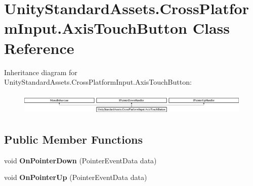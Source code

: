 \hypertarget{class_unity_standard_assets_1_1_cross_platform_input_1_1_axis_touch_button}{}\section{Unity\+Standard\+Assets.\+Cross\+Platform\+Input.\+Axis\+Touch\+Button Class Reference}
\label{class_unity_standard_assets_1_1_cross_platform_input_1_1_axis_touch_button}
Inheritance diagram for Unity\+Standard\+Assets.\+Cross\+Platform\+Input.\+Axis\+Touch\+Button\+:\begin{figure}[H]
\begin{center}
\leavevmode
\includegraphics[height=1.085271cm]{class_unity_standard_assets_1_1_cross_platform_input_1_1_axis_touch_button}
\end{center}
\end{figure}
\subsection*{Public Member Functions}
\begin{DoxyCompactItemize}
\item 
\mbox{\label{class_unity_standard_assets_1_1_cross_platform_input_1_1_axis_touch_button_a854d21df612c905d76e94202de62d7f4}} 
void {\bfseries On\+Pointer\+Down} (Pointer\+Event\+Data data)
\item 
\mbox{\label{class_unity_standard_assets_1_1_cross_platform_input_1_1_axis_touch_button_af74585809c7ae2aae9e0ee89fc21b689}} 
void {\bfseries On\+Pointer\+Up} (Pointer\+Event\+Data data)
\end{DoxyCompactItemize}
